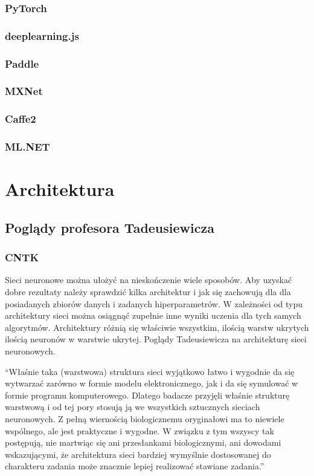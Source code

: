 \documentclass[a4paper,twoside,titlepage,openright]{book}
\begin{document}
\subsection{PyTorch}
\subsection{deeplearning.js}
\subsection{Paddle}
\subsection{MXNet}
\subsection{Caffe2}
\subsection{ML.NET}

\chapter{Architektura}
\section{Poglądy profesora Tadeusiewicza}
\subsection{CNTK}
Sieci neuronowe można ułożyć na nieskończenie wiele sposobów. Aby uzyskać dobre rezultaty należy sprawdzić kilka architektur i jak się zachowują dla dla posiadanych zbiorów danych i zadanych hiperparametrów.
W zależności od typu architektury sieci można osiągnąć zupełnie inne wyniki uczenia dla tych samych algorytmów. 
Architektury różnią się właściwie wszystkim, ilością warstw ukrytych ilością neuronów w warstwie ukrytej. 
Poglądy Tadeusiewicza na architekturę sieci neuronowych.

“Właśnie taka (warstwowa) struktura sieci wyjątkowo łatwo i wygodnie da się wytwarzać zarówno w formie modelu elektronicznego, jak i da się symulować w formie programu komputerowego. Dlatego badacze przyjęli właśnie strukturę warstwową i od tej pory stosują ją we wszystkich sztucznych sieciach neuronowych. Z pełną wiernością biologicznemu oryginałowi ma to niewiele wspólnego, ale jest praktyczne i wygodne. W związku z tym wszyscy tak postępują, nie martwiąc się ani przesłankami biologicznymi, ani dowodami wskazującymi, że architektura sieci bardziej wymyślnie dostosowanej do charakteru zadania może znacznie lepiej realizować stawiane zadania.”
\end{document}
